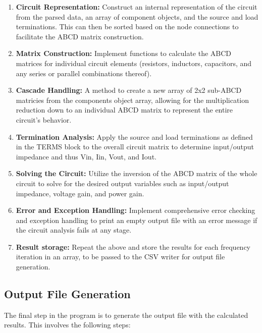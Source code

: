 \documentclass[a4paper]{article}
\begin{document}
\begin{enumerate}
    \item \textbf{Circuit Representation:} Construct an internal representation of the circuit from the parsed data, an array of component objects, and the source and load terminations. This can then be sorted based on the node connections to facilitate the ABCD matrix construction.
    \item \textbf{Matrix Construction:} Implement functions to calculate the ABCD matrices for individual circuit elements (resistors, inductors, capacitors, and any series or parallel combinations thereof).
    \item \textbf{Cascade Handling:} A method to create a new array of 2x2 sub-ABCD matricies from the components object array, allowing for the multiplication reduction down to an individual ABCD matrix to represent the entire circuit's behavior.
    \item \textbf{Termination Analysis:} Apply the source and load terminations as defined in the TERMS block to the overall circuit matrix to determine input/output impedance and thus Vin, Iin, Vout, and Iout.
    \item \textbf{Solving the Circuit:} Utilize the inversion of the ABCD matrix of the whole circuit to solve for the desired output variables such as input/output impedance, voltage gain, and power gain.
    \item \textbf{Error and Exception Handling:} Implement comprehensive error checking and exception handling to print an empty output file with an error message if the circuit analysis fails at any stage.
    \item \textbf{Result storage:} Repeat the above and store the results for each frequency iteration in an array, to be passed to the CSV writer for output file generation.
\end{enumerate}

\subsection*{Output File Generation}
The final step in the program is to generate the output file with the calculated results. This involves the following steps:
\end{document}
